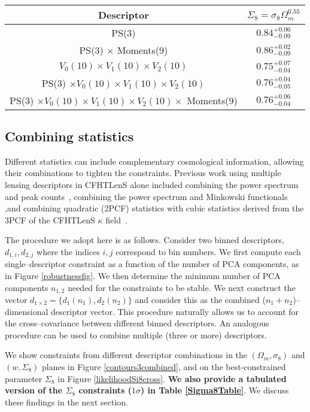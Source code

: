 \documentclass[reprint,aps,prd,superscriptaddress,showkeys,showpacs]{revtex4-1}
\begin{document}
\begin{table*}
\begin{tabular}{c|c}
Descriptor & $\Sigma_8=\sigma_8\Omega_m^{0.55}$ \\ \hline \hline
PS(3) & $0.84^{+0.06}_{-0.09}$\\
PS(3) $\times$ Moments(9) & $0.86^{+0.02}_{-0.09}$ \\
$V_0(10)\times V_1(10) \times V_2(10)$  & $0.75^{+0.07}_{-0.04}$ \\
PS(3) $\times V_0(10)\times V_1(10) \times V_2(10)$ & $0.76^{+0.04}_{-0.05}$ \\
PS(3) $\times V_0(10)\times V_1(10) \times V_2(10) \times$ Moments(9) & $0.76^{+0.06}_{-0.04}$ \\ \hline
\end{tabular}
\caption{Tabulated values of $1\sigma$ constraints on $\Sigma_8$ corresponding to Figure \ref{likelihoodSi8cross}}
\label{Sigma8Table}
\end{table*}

\subsection{Combining statistics}

Different statistics can include complementary cosmological
information, allowing their combinations to tighten the
constraints. Previous work using multiple lensing descriptors in
CFHTLenS alone included combining the power spectrum and peak
counts~\citep{Companion}, combining the power spectrum and Minkowski functionals ~\citep{CFHTMasato} ,and combining quadratic (2PCF) statistics
with cubic statistics derived from the 3PCF of the CFHTLenS $\kappa$ field~\citep{CFHTFu}.

The procedure we adopt here is as follows. Consider two binned
descriptors, $d_{1,i},d_{2,j}$ where the indices $i,j$ correspond to
bin numbers.  We first compute each single--descriptor constraint as a
function of the number of PCA components, as in Figure
\ref{robustnessfig}. We then determine the minimum number of PCA
components $n_{1,2}$ needed for the constraints to be stable. We next
construct the vector $d_{1\times2} = \{d_1(n_1),d_2(n_2)\}$ and
consider this as the combined ($n_1+n_2$)--dimensional descriptor
vector. This procedure naturally allows us to account for the
cross--covariance between different binned descriptors. An analogous
procedure can be used to combine multiple (three or more)
descriptors. 


We show constraints from different descriptor combinations in the
$(\Omega_m,\sigma_8)$ and $(w,\Sigma_8)$ planes in Figure
\ref{contours3combined}, and on the best-constrained parameter
$\Sigma_8$ in Figure \ref{likelihoodSi8cross}. \textbf{We also provide a tabulated version of the $\Sigma_8$ constraints ($1\sigma$) in Table \ref{Sigma8Table}}. We discuss these findings in the next section.
\end{document}
